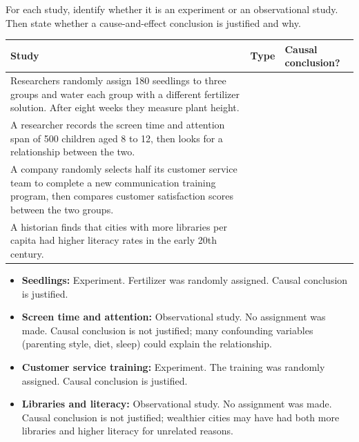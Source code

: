 \begin{Exercise}[title={Experiment or Observational Study?}, label={ex:observe}]
For each study, identify whether it is an experiment or an observational study. Then state whether a cause-and-effect 
conclusion is justified and why.

\medskip
\begin{tabular}{|p{}|p{}|p{}|}
\hline
\textbf{Study} & \textbf{Type} & \textbf{Causal conclusion?} \\
\hline
Researchers randomly assign 180 seedlings to three groups and water each group with a different fertilizer solution. 
After eight weeks they measure plant height. & & \\[2.5em]
\hline
A researcher records the screen time and attention span of 500 children aged 8 to 12, then looks for a relationship 
between the two. & & \\[2.5em]
\hline
A company randomly selects half its customer service team to complete a new communication training program, 
then compares customer satisfaction scores between the two groups. & & \\[2.5em]
\hline
A historian finds that cities with more libraries per capita had higher literacy rates in the early 20th century. & & \\[2.5em]
\hline
\end{tabular}
\end{Exercise}
\begin{Answer}[ref={ex:observe}]
\begin{itemize}
    \item \textbf{Seedlings:} Experiment. Fertilizer was randomly assigned. Causal conclusion is justified.
    \item \textbf{Screen time and attention:} Observational study. No assignment was made. Causal conclusion is not 
    justified; many confounding variables (parenting style, diet, sleep) could explain the relationship.
    \item \textbf{Customer service training:} Experiment. The training was randomly assigned. Causal conclusion is justified.
    \item \textbf{Libraries and literacy:} Observational study. No assignment was made. Causal conclusion is not justified; 
    wealthier cities may have had both more libraries and higher literacy for unrelated reasons.
\end{itemize}
\end{Answer}


